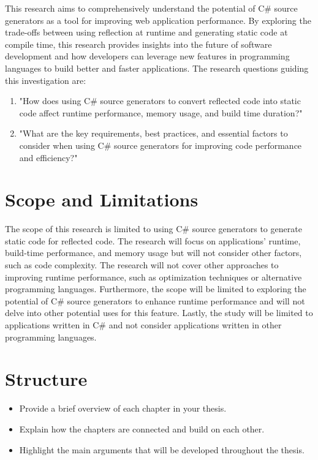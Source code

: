 This research aims to comprehensively understand the potential of C\# source generators as a tool for improving web application performance. By exploring the trade-offs between using reflection at runtime and generating static code at compile time, this research provides insights into the future of software development and how developers can leverage new features in programming languages to build better and faster applications. The research questions guiding this investigation are:

\begin{enumerate}[label=\textbf{RQ.\arabic*}:, leftmargin=*, labelindent=1em]
    \item "How does using C\# source generators to convert reflected code into static code affect runtime performance, memory usage, and build time duration?"
    \item "What are the key requirements, best practices, and essential factors to consider when using C\# source generators for improving code performance and efficiency?"
\end{enumerate}

\section{Scope and Limitations}

The scope of this research is limited to using C\# source generators to generate static code for reflected code. The research will focus on applications' runtime, build-time performance, and memory usage but will not consider other factors, such as code complexity. The research will not cover other approaches to improving runtime performance, such as optimization techniques or alternative programming languages. Furthermore, the scope will be limited to exploring the potential of C\# source generators to enhance runtime performance and will not delve into other potential uses for this feature. Lastly, the study will be limited to applications written in C\# and not consider applications written in other programming languages.

\section{Structure}

\begin{itemize}
    \item Provide a brief overview of each chapter in your thesis.
    \item Explain how the chapters are connected and build on each other.
    \item Highlight the main arguments that will be developed throughout the thesis.
\end{itemize}